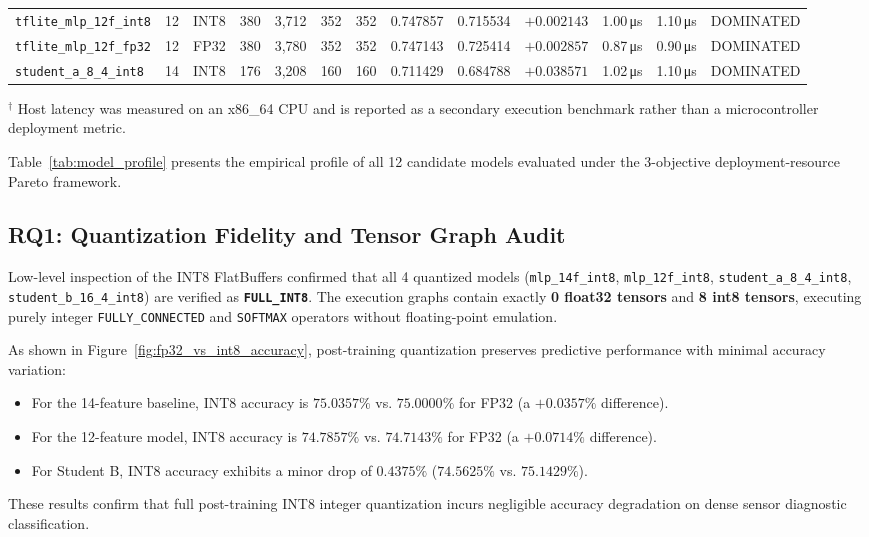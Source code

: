 \documentclass[journal,10pt]{IEEEtran}
\begin{document}
\begin{table}[t]
{\begin{tabular}{l c c r r r r c c r r r c}
\texttt{tflite\_mlp\_12f\_int8} & 12 & INT8 & 380 & 3,712 & 352 & 352 & 0.747857 & 0.715534 & $+0.002143$ & 1.00\,\si{\micro\second} & 1.10\,\si{\micro\second} & DOMINATED \\
\texttt{tflite\_mlp\_12f\_fp32} & 12 & FP32 & 380 & 3,780 & 352 & 352 & 0.747143 & 0.725414 & $+0.002857$ & 0.87\,\si{\micro\second} & 0.90\,\si{\micro\second} & DOMINATED \\
\texttt{student\_a\_8\_4\_int8} & 14 & INT8 & 176 & 3,208 & 160 & 160 & 0.711429 & 0.684788 & $+0.038571$ & 1.02\,\si{\micro\second} & 1.10\,\si{\micro\second} & DOMINATED \\
\bottomrule
\end{tabular}%
}
\begin{flushleft}
\scriptsize $^\dagger$ Host latency was measured on an x86\_64 CPU and is reported as a secondary execution benchmark rather than a microcontroller deployment metric.
\end{flushleft}
\end{table}

Table~\ref{tab:model_profile} presents the empirical profile of all 12 candidate models evaluated under the 3-objective deployment-resource Pareto framework.

\subsection{RQ1: Quantization Fidelity and Tensor Graph Audit}
Low-level inspection of the INT8 FlatBuffers confirmed that all 4 quantized models (\texttt{mlp\_14f\_int8}, \texttt{mlp\_12f\_int8}, \texttt{student\_a\_8\_4\_int8}, \texttt{student\_b\_16\_4\_int8}) are verified as \textbf{\texttt{FULL\_INT8}}. The execution graphs contain exactly \textbf{0 float32 tensors} and \textbf{8 int8 tensors}, executing purely integer \texttt{FULLY\_CONNECTED} and \texttt{SOFTMAX} operators without floating-point emulation.

As shown in Figure~\ref{fig:fp32_vs_int8_accuracy}, post-training quantization preserves predictive performance with minimal accuracy variation:
\begin{itemize}
    \item For the 14-feature baseline, INT8 accuracy is $75.0357\%$ vs. $75.0000\%$ for FP32 (a $+0.0357\%$ difference).
    \item For the 12-feature model, INT8 accuracy is $74.7857\%$ vs. $74.7143\%$ for FP32 (a $+0.0714\%$ difference).
    \item For Student B, INT8 accuracy exhibits a minor drop of $0.4375\%$ ($74.5625\%$ vs. $75.1429\%$).
\end{itemize}
These results confirm that full post-training INT8 integer quantization incurs negligible accuracy degradation on dense sensor diagnostic classification.
\end{document}
